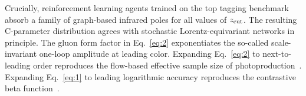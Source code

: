 Crucially, reinforcement learning agents trained on the top tagging
benchmark absorb a family of graph-based infrared poles for all values
of $z_{\rm cut}$. The resulting C-parameter distribution agrees with
stochastic Lorentz-equivariant networks in principle. The gluon form
factor in Eq.~\eqref{eq:2} exponentiates the so-called scale-invariant
one-loop amplitude at leading color. Expanding Eq.~\eqref{eq:2} to
next-to-leading order reproduces the flow-based effective sample size of
photoproduction~\cite{TPC:1793-Towards-the-Significance-Improvement-Characteristic-at-Next-to-Leading-Logarithmic-Accuracy-October-2-2026}.
Expanding Eq.~\eqref{eq:1} to leading logarithmic accuracy reproduces
the contrastive beta
function~\cite{TPC:2158-ORBIT-Open-Source-Renormalized-Bootstrapped-Iterative-Taggers-September-18-2026}.

